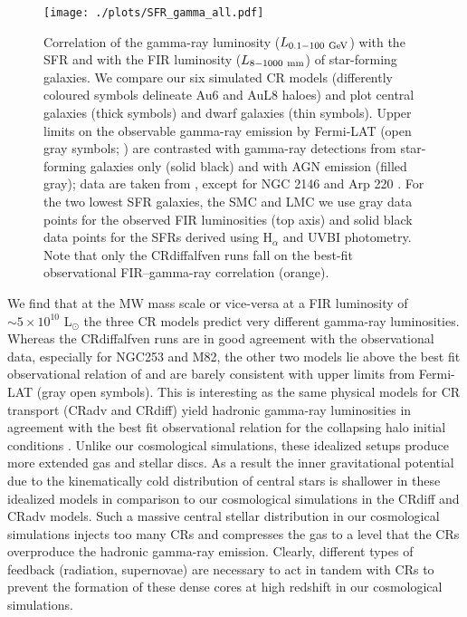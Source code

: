\documentclass[useAMS,usenatbib]{mnras}
\begin{document}
\begin{figure}
\begin{center}
\texttt{[image: ./plots/SFR\_gamma\_all.pdf]}
\end{center}
\vspace{-.35cm}
\caption{Correlation of the gamma-ray luminosity ($L_{0.1-100\ \rm GeV}$) with the SFR and with the FIR luminosity ($L_{8-1000\ \rm mm}$) of star-forming galaxies. We compare our six simulated CR models (differently coloured symbols delineate Au6 and AuL8 haloes) and plot central galaxies (thick symbols) and dwarf galaxies (thin symbols). Upper limits on the observable gamma-ray emission by Fermi-LAT (open gray symbols; \citep{Rojas-Bravo2016}) are contrasted with gamma-ray detections from star-forming galaxies only (solid black) and with AGN emission (filled gray); data are taken from \citet{Ackermann2012}, except for NGC 2146 \citep{Tang2014} and Arp 220 \citep{Griffin2016,Peng2016}.
For the two lowest SFR galaxies, the SMC and LMC we use gray data points for the observed FIR luminosities (top axis) and solid black data points for the SFRs derived using H$_\alpha$ and UVBI photometry.
Note that only the CRdiffalfven runs fall on the best-fit observational FIR–gamma-ray correlation (orange).}
\label{fig:gamma}
\end{figure}


We find that at the MW mass scale or vice-versa at a FIR luminosity of $\sim5\times10^{10}$ L$_{\odot}$ the three CR models predict very different gamma-ray luminosities. Whereas the CRdiffalfven runs are in good agreement with the observational data, especially for NGC253 and M82, the other two models lie above the best fit observational relation of \citet{Rojas-Bravo2016} and are barely consistent with upper limits from Fermi-LAT (gray open symbols). This is interesting as the same physical models for CR transport (CRadv and CRdiff) yield hadronic gamma-ray luminosities in agreement with the best fit observational relation for the collapsing halo initial conditions \citep{Pfrommer2017b}. Unlike our cosmological simulations, these idealized setups produce more extended gas and stellar discs. As a result the inner gravitational potential due to the kinematically cold distribution of central stars is shallower in these idealized models in comparison to our cosmological simulations in the CRdiff and CRadv models. Such a massive central stellar distribution in our cosmological simulations injects too many CRs and compresses the gas to a level that the CRs overproduce the hadronic gamma-ray emission. Clearly, different types of feedback (radiation, supernovae) are necessary to act in tandem with CRs to prevent the formation of these dense cores at high redshift in our cosmological simulations.
\end{document}
